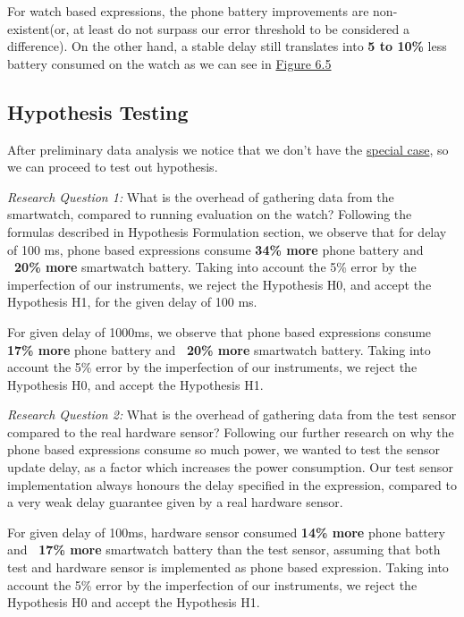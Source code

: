 For watch based expressions, the phone battery improvements are non-existent(or, at least do not surpass our error threshold to be considered a difference). On the other hand,
a stable delay still translates into \textbf{ 5 to 10\%} less battery consumed on the watch as we can see in \hyperref[fig:wear_expr_consumption]{Figure 6.5}

\subsection{Hypothesis Testing}
After preliminary data analysis we notice that we don't have the \hyperref[special_case]{special case}, so we can proceed to test out hypothesis.

\textit{Research Question 1:} What is the overhead of gathering data from the smartwatch, compared to running evaluation on the watch? \newline
Following the formulas described in Hypothesis Formulation section, we observe that for delay of 100 ms, phone based expressions consume 
\textbf{34\% more} phone battery and \textbf{~20\% more } smartwatch battery. Taking into account the 5\% error by the imperfection of our instruments,
we reject the Hypothesis H0, and accept the Hypothesis H1, for the given delay of 100 ms.

For given delay of 1000ms, we observe that  phone based expressions consume 
\textbf{17\% more} phone battery and \textbf{~20\% more } smartwatch battery. Taking into account the 5\% error by the imperfection of our instruments,
we reject the Hypothesis H0, and accept the Hypothesis H1.

 \textit{Research Question 2:}  What is the overhead of gathering data from the test sensor compared to the real hardware sensor?\newline
Following our further research on why the phone based expressions consume so much power, we wanted to test the sensor update delay, as a factor
which increases the power consumption. Our test sensor implementation always honours the delay specified in the expression, compared to a very weak delay guarantee
given by a real hardware sensor.

For given delay of 100ms, hardware sensor consumed \textbf{14\% more} phone battery and \textbf{~17\% more } smartwatch battery than the test sensor, assuming that both test and hardware
sensor is implemented as phone based expression.
Taking into account the 5\% error by the imperfection of our instruments, we reject the Hypothesis H0 and accept the Hypothesis H1.

